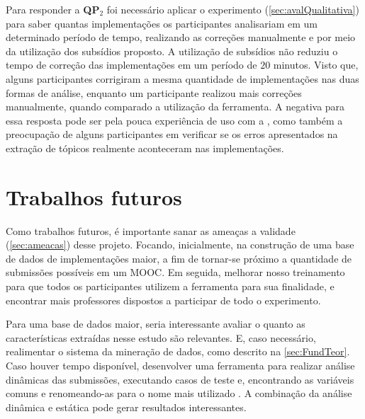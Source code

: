 	Para responder a \textbf{QP$_2$} foi necessário aplicar o experimento (\cref{sec:avalQualitativa})
	para saber quantas implementações os participantes analisariam em um determinado
	período de tempo, realizando as correções manualmente e por meio da utilização dos
	subsídios proposto. A utilização de subsídios não reduziu o tempo de correção
	das implementações em um período de $20$ minutos. Visto que, alguns participantes
	corrigiram a mesma quantidade de implementações nas duas formas de análise, enquanto
	um participante realizou mais correções manualmente, quando comparado a utilização
	da ferramenta. A negativa para essa resposta pode ser pela pouca experiência de uso
	com a , como também a preocupação de alguns participantes em
	verificar se os erros apresentados na extração de tópicos realmente aconteceram
	nas implementações.
	
	\section{Trabalhos futuros}
	
		Como trabalhos futuros, é importante sanar as ameaças a validade (\cref{sec:ameacas})
		desse projeto. Focando, inicialmente, na construção de uma base de dados de
		implementações maior, a fim de tornar-se próximo a quantidade de submissões
		possíveis em um \acs{MOOC}. Em seguida, melhorar nosso treinamento para que
		todos os participantes utilizem a ferramenta para sua finalidade, e encontrar
		mais professores dispostos a participar de todo o experimento.
		
		Para uma base de dados maior, seria interessante avaliar o quanto as características
		extraídas nesse estudo são relevantes. E, caso necessário, realimentar o
		sistema da mineração de dados, como descrito na \cref{sec:FundTeor}. Caso
		houver tempo disponível, desenvolver uma ferramenta para realizar análise
		dinâmicas das submissões, executando casos de teste e, encontrando as variáveis
		comuns e renomeando-as para o nome mais utilizado \cite{Glassman:2015}.
		A combinação da análise dinâmica e estática pode gerar resultados interessantes.
